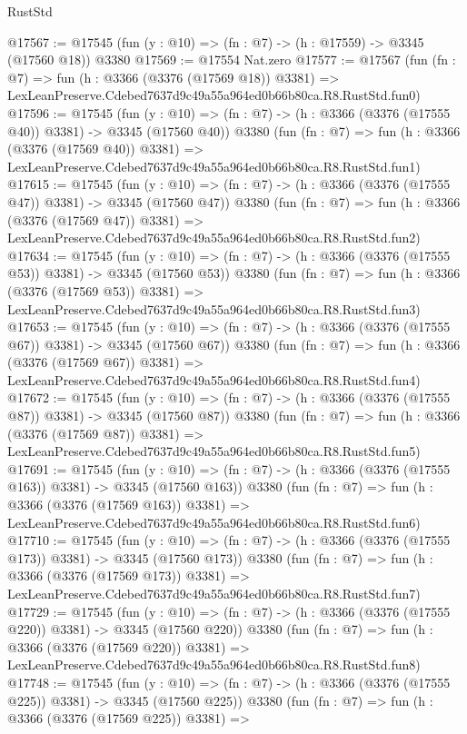 \begin{lexlean}{RustStd}
\begin{coremodule}
@17567 := @17545 (fun (y : @10) => (fn : @7) -> (h : @17559) -> @3345 (@17560 @18)) @3380
@17569 := @17554 Nat.zero
@17577 := @17567
    (fun (fn : @7) =>
    fun (h : @3366 (@3376 (@17569 @18)) @3381) =>
    LexLeanPreserve.Cdebed7637d9c49a55a964ed0b66b80ca.R8.RustStd.fun0)
@17596 := @17545
    (fun (y : @10) => (fn : @7) -> (h : @3366 (@3376 (@17555 @40)) @3381) -> @3345 (@17560 @40))
    @3380
    (fun (fn : @7) =>
    fun (h : @3366 (@3376 (@17569 @40)) @3381) =>
    LexLeanPreserve.Cdebed7637d9c49a55a964ed0b66b80ca.R8.RustStd.fun1)
@17615 := @17545
    (fun (y : @10) => (fn : @7) -> (h : @3366 (@3376 (@17555 @47)) @3381) -> @3345 (@17560 @47))
    @3380
    (fun (fn : @7) =>
    fun (h : @3366 (@3376 (@17569 @47)) @3381) =>
    LexLeanPreserve.Cdebed7637d9c49a55a964ed0b66b80ca.R8.RustStd.fun2)
@17634 := @17545
    (fun (y : @10) => (fn : @7) -> (h : @3366 (@3376 (@17555 @53)) @3381) -> @3345 (@17560 @53))
    @3380
    (fun (fn : @7) =>
    fun (h : @3366 (@3376 (@17569 @53)) @3381) =>
    LexLeanPreserve.Cdebed7637d9c49a55a964ed0b66b80ca.R8.RustStd.fun3)
@17653 := @17545
    (fun (y : @10) => (fn : @7) -> (h : @3366 (@3376 (@17555 @67)) @3381) -> @3345 (@17560 @67))
    @3380
    (fun (fn : @7) =>
    fun (h : @3366 (@3376 (@17569 @67)) @3381) =>
    LexLeanPreserve.Cdebed7637d9c49a55a964ed0b66b80ca.R8.RustStd.fun4)
@17672 := @17545
    (fun (y : @10) => (fn : @7) -> (h : @3366 (@3376 (@17555 @87)) @3381) -> @3345 (@17560 @87))
    @3380
    (fun (fn : @7) =>
    fun (h : @3366 (@3376 (@17569 @87)) @3381) =>
    LexLeanPreserve.Cdebed7637d9c49a55a964ed0b66b80ca.R8.RustStd.fun5)
@17691 := @17545
    (fun (y : @10) => (fn : @7) -> (h : @3366 (@3376 (@17555 @163)) @3381) -> @3345 (@17560 @163))
    @3380
    (fun (fn : @7) =>
    fun (h : @3366 (@3376 (@17569 @163)) @3381) =>
    LexLeanPreserve.Cdebed7637d9c49a55a964ed0b66b80ca.R8.RustStd.fun6)
@17710 := @17545
    (fun (y : @10) => (fn : @7) -> (h : @3366 (@3376 (@17555 @173)) @3381) -> @3345 (@17560 @173))
    @3380
    (fun (fn : @7) =>
    fun (h : @3366 (@3376 (@17569 @173)) @3381) =>
    LexLeanPreserve.Cdebed7637d9c49a55a964ed0b66b80ca.R8.RustStd.fun7)
@17729 := @17545
    (fun (y : @10) => (fn : @7) -> (h : @3366 (@3376 (@17555 @220)) @3381) -> @3345 (@17560 @220))
    @3380
    (fun (fn : @7) =>
    fun (h : @3366 (@3376 (@17569 @220)) @3381) =>
    LexLeanPreserve.Cdebed7637d9c49a55a964ed0b66b80ca.R8.RustStd.fun8)
@17748 := @17545
    (fun (y : @10) => (fn : @7) -> (h : @3366 (@3376 (@17555 @225)) @3381) -> @3345 (@17560 @225))
    @3380
    (fun (fn : @7) =>
    fun (h : @3366 (@3376 (@17569 @225)) @3381) =>

\end{coremodule}
\end{lexlean}
